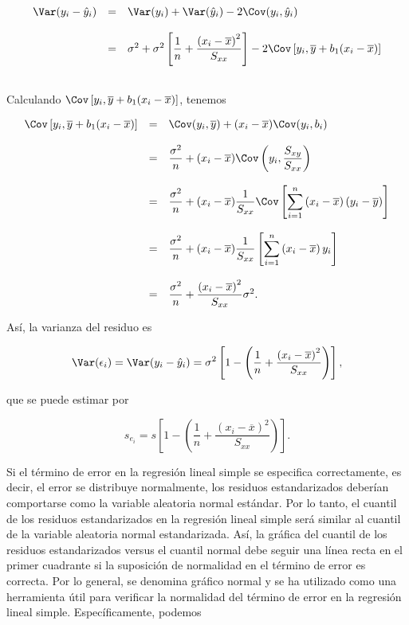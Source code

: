 $$
\begin{array}{rcl}
    \Var(y_i-\hat{y}_i) &=& \Var(y_i)+\Var(\hat{y}_i)-2\Cov(y_i,\hat{y}_i)\\\\
			&=& \sigma^2+\sigma^2\left[\dfrac{1}{n}+\dfrac{\left(x_i-\overline{x}\right)^2}{S_{xx}}\right]-2\Cov\left[y_i,\overline{y}+b_1(x_i-\overline{x})\right]\\\\
\end{array}
$$

Calculando $\Cov\left[y_i,\overline{y}+b_1(x_i-\overline{x})\right]$, tenemos

$$
\begin{array}{rcl}
    \Cov\left[y_i,\overline{y}+b_1(x_i-\overline{x})\right] &=& \Cov(y_i,\overline{y}) + (x_i-\overline{x})\Cov(y_i,b_i)\\\\
							    &=& \dfrac{\sigma^2}{n} + (x_i-\overline{x})\Cov\left(y_i,\dfrac{S_{xy}}{S_{xx}}\right)\\\\
							    &=& \dfrac{\sigma^2}{n} + (x_i-\overline{x})\dfrac{1}{S_{xx}}\Cov\left[\displaystyle\sum_{i=1}^n\left(x_i-\overline{x}\right)(y_i-\overline{y})\right]\\\\
							    &=& \dfrac{\sigma^2}{n} + (x_i-\overline{x})\dfrac{1}{S_{xx}}\left[\displaystyle\sum_{i=1}^n\left(x_i-\overline{x}\right)y_i\right]\\\\
							    &=& \dfrac{\sigma^2}{n} + \dfrac{\left(x_i-\overline{x}\right)^2}{S_{xx}}\sigma^2.

\end{array}
$$

Así, la varianza del residuo es
\begin{tcolorbox}
    $$\Var(\epsilon_i)=\Var(y_i-\hat{y}_i)=\sigma^2\left[1-\left(\dfrac{1}{n}+\dfrac{\left(x_i-\overline{x}\right)^2}{S_{xx}}\right)\right],$$
\end{tcolorbox}

que se puede estimar por
\begin{tcolorbox}
    $$s_{e_i}=s\left[1-\left(\dfrac{1}{n}+\dfrac{\left(x_i-\overline{x}\right)^2}{S_{xx}}\right)\right].$$
\end{tcolorbox}

Si el término de error en la regresión lineal simple se especifica correctamente, es decir, el error se distribuye normalmente, los residuos estandarizados deberían comportarse como la variable aleatoria normal estándar. Por lo tanto, el cuantil de los residuos estandarizados en la regresión lineal simple será similar al cuantil de la variable aleatoria normal estandarizada. Así, la gráfica del cuantil de los residuos estandarizados versus el cuantil normal debe seguir una línea recta en el primer cuadrante si la suposición de normalidad en el término de error es correcta. Por lo general, se denomina gráfico normal y se ha utilizado como una herramienta útil para verificar la normalidad del término de error en la regresión lineal simple. Específicamente, podemos

